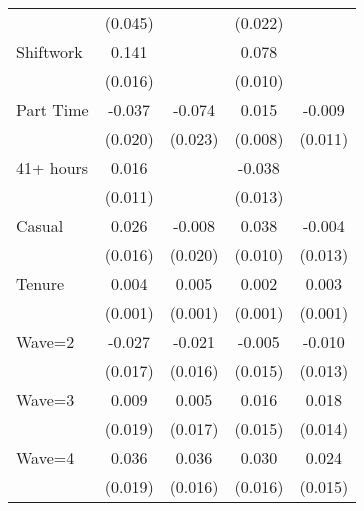 {\begin{tabular}{l*{4}{c}}
                    &     (0.045)         &                     &     (0.022)         &                     \\
[1em]
Shiftwork           &       0.141\sym{***}&                     &       0.078\sym{***}&                     \\
                    &     (0.016)         &                     &     (0.010)         &                     \\
[1em]
Part Time           &      -0.037         &      -0.074\sym{**} &       0.015         &      -0.009         \\
                    &     (0.020)         &     (0.023)         &     (0.008)         &     (0.011)         \\
[1em]
41+ hours           &       0.016         &                     &      -0.038\sym{**} &                     \\
                    &     (0.011)         &                     &     (0.013)         &                     \\
[1em]
Casual              &       0.026         &      -0.008         &       0.038\sym{***}&      -0.004         \\
                    &     (0.016)         &     (0.020)         &     (0.010)         &     (0.013)         \\
[1em]
Tenure              &       0.004\sym{***}&       0.005\sym{***}&       0.002\sym{***}&       0.003\sym{***}\\
                    &     (0.001)         &     (0.001)         &     (0.001)         &     (0.001)         \\
[1em]
Wave=2              &      -0.027         &      -0.021         &      -0.005         &      -0.010         \\
                    &     (0.017)         &     (0.016)         &     (0.015)         &     (0.013)         \\
[1em]
Wave=3              &       0.009         &       0.005         &       0.016         &       0.018         \\
                    &     (0.019)         &     (0.017)         &     (0.015)         &     (0.014)         \\
[1em]
Wave=4              &       0.036         &       0.036\sym{*}  &       0.030         &       0.024         \\
                    &     (0.019)         &     (0.016)         &     (0.016)         &     (0.015)         \\

\end{tabular}}
